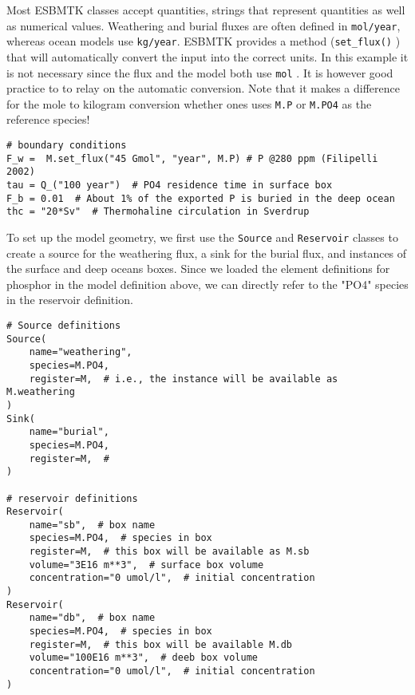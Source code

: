 \documentclass[11pt]{article}
\begin{document}
Most ESBMTK classes accept quantities, strings that represent quantities as well as numerical values. Weathering and burial fluxes are often defined in \texttt{mol/year}, whereas ocean models use \texttt{kg/year}. ESBMTK provides a method (\texttt{set\_flux()} )  that will automatically convert the input into the correct units. In this example it is not necessary since the flux and the model both use \texttt{mol} . It is however good practice to to relay on the automatic conversion. Note that it makes a difference for the mole to kilogram conversion whether ones uses \texttt{M.P} or \texttt{M.PO4} as the reference species!
\begin{verbatim}
# boundary conditions
F_w =  M.set_flux("45 Gmol", "year", M.P) # P @280 ppm (Filipelli 2002)
tau = Q_("100 year")  # PO4 residence time in surface box
F_b = 0.01  # About 1% of the exported P is buried in the deep ocean
thc = "20*Sv"  # Thermohaline circulation in Sverdrup
\end{verbatim}

To set up the model geometry, we first  use the \texttt{Source} and  \texttt{Reservoir} classes  to create a source for the weathering flux, a sink for the burial flux, and instances of the surface and deep oceans boxes. Since we loaded the element definitions for phosphor in the model definition above, we can directly refer to the "PO4" species in the reservoir definition. 
\begin{verbatim}
# Source definitions
Source(
    name="weathering",
    species=M.PO4,
    register=M,  # i.e., the instance will be available as M.weathering
)
Sink(
    name="burial",
    species=M.PO4,
    register=M,  #
)

# reservoir definitions
Reservoir(
    name="sb",  # box name
    species=M.PO4,  # species in box
    register=M,  # this box will be available as M.sb
    volume="3E16 m**3",  # surface box volume
    concentration="0 umol/l",  # initial concentration
)
Reservoir(
    name="db",  # box name
    species=M.PO4,  # species in box
    register=M,  # this box will be available M.db
    volume="100E16 m**3",  # deeb box volume
    concentration="0 umol/l",  # initial concentration
)
\end{verbatim}
\end{document}
